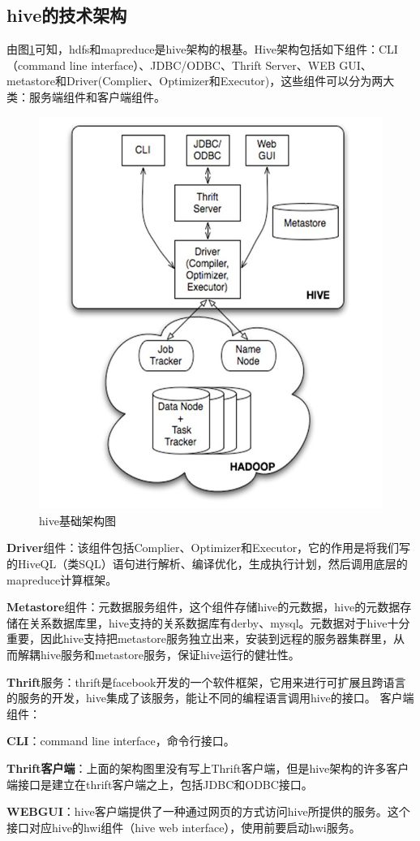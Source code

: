 \subsection{hive的技术架构}
\par 由图\ref{fig-hive-1}可知，hdfs和mapreduce是hive架构的根基。Hive架构包括如下组件：CLI（command line interface）、JDBC/ODBC、Thrift Server、WEB GUI、metastore和Driver(Complier、Optimizer和Executor)，这些组件可以分为两大类：服务端组件和客户端组件。
\begin{figure}[htbp]
\centering\includegraphics[width=.6\linewidth]{figures/hive.png}
\caption{hive基础架构图}\label{fig-hive-1}
\end{figure} 
\par \textbf{Driver}组件：该组件包括Complier、Optimizer和Executor，它的作用是将我们写的HiveQL（类SQL）语句进行解析、编译优化，生成执行计划，然后调用底层的mapreduce计算框架。
\par \textbf{Metastore}组件：元数据服务组件，这个组件存储hive的元数据，hive的元数据存储在关系数据库里，hive支持的关系数据库有derby、mysql。元数据对于hive十分重要，因此hive支持把metastore服务独立出来，安装到远程的服务器集群里，从而解耦hive服务和metastore服务，保证hive运行的健壮性。
\par \textbf{Thrift}服务：thrift是facebook开发的一个软件框架，它用来进行可扩展且跨语言的服务的开发，hive集成了该服务，能让不同的编程语言调用hive的接口。
客户端组件：
\par \textbf{CLI}：command line interface，命令行接口。
\par \textbf{Thrift客户端}：上面的架构图里没有写上Thrift客户端，但是hive架构的许多客户端接口是建立在thrift客户端之上，包括JDBC和ODBC接口。
\par \textbf{WEBGUI}：hive客户端提供了一种通过网页的方式访问hive所提供的服务。这个接口对应hive的hwi组件（hive web interface），使用前要启动hwi服务。
